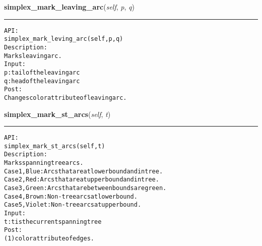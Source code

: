     \label{coinor:gimpy:graph:Graph:simplex_mark_leaving_arc}

    \vspace{0.5ex}

\hspace{.8\funcindent}\begin{boxedminipage}{\funcwidth}

    \raggedright \textbf{simplex\_mark\_leaving\_arc}(\textit{self}, \textit{p}, \textit{q})

    \vspace{-1.5ex}

    \rule{\textwidth}{0.5\fboxrule}
\setlength{\parskip}{2ex}
\begin{alltt}

API:
    simplex\_mark\_leving\_arc(self, p, q)
Description:
    Marks leaving arc.
Input:
    p: tail of the leaving arc
    q: head of the leaving arc
Post:
    Changes color attribute of leaving arc.
\end{alltt}

\setlength{\parskip}{1ex}
    \end{boxedminipage}

    \label{coinor:gimpy:graph:Graph:simplex_mark_st_arcs}

    \vspace{0.5ex}

\hspace{.8\funcindent}\begin{boxedminipage}{\funcwidth}

    \raggedright \textbf{simplex\_mark\_st\_arcs}(\textit{self}, \textit{t})

    \vspace{-1.5ex}

    \rule{\textwidth}{0.5\fboxrule}
\setlength{\parskip}{2ex}
\begin{alltt}

API:
    simplex\_mark\_st\_arcs(self, t)
Description:
    Marks spanning tree arcs.
    Case 1, Blue: Arcs that are at lower bound and in tree.
    Case 2, Red: Arcs that are at upper bound and in tree.
    Case 3, Green: Arcs that are between bounds are green.
    Case 4, Brown: Non-tree arcs at lower bound.
    Case 5, Violet: Non-tree arcs at upper bound.
Input:
    t: t is the current spanning tree
Post:
    (1) color attribute of edges.
\end{alltt}

\setlength{\parskip}{1ex}
    \end{boxedminipage}

